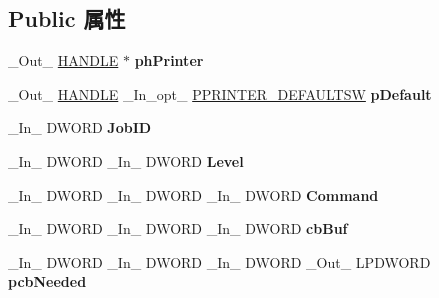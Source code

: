 \subsection*{Public 属性}
\begin{DoxyCompactItemize}
\item 
\mbox{\label{struct___p_r_i_n_t_p_r_o_v_i_d_o_r_ac4fcfcd20a19b080fd0873e2b8cba8e6}} 
\+\_\+\+Out\+\_\+ \hyperlink{interfacevoid}{H\+A\+N\+D\+LE} $\ast$ {\bfseries ph\+Printer}
\item 
\mbox{\label{struct___p_r_i_n_t_p_r_o_v_i_d_o_r_ab5c35acd6aad201cb9554fdc0b8255ff}} 
\+\_\+\+Out\+\_\+ \hyperlink{interfacevoid}{H\+A\+N\+D\+LE} \+\_\+\+In\+\_\+opt\+\_\+ \hyperlink{struct___p_r_i_n_t_e_r___d_e_f_a_u_l_t_s_w}{P\+P\+R\+I\+N\+T\+E\+R\+\_\+\+D\+E\+F\+A\+U\+L\+T\+SW} {\bfseries p\+Default}
\item 
\mbox{\label{struct___p_r_i_n_t_p_r_o_v_i_d_o_r_a7c3f4af3a2bed45e8647019e83af1e6c}} 
\+\_\+\+In\+\_\+ D\+W\+O\+RD {\bfseries Job\+ID}
\item 
\mbox{\label{struct___p_r_i_n_t_p_r_o_v_i_d_o_r_a8029083bfd896099954d260a08953b11}} 
\+\_\+\+In\+\_\+ D\+W\+O\+RD \+\_\+\+In\+\_\+ D\+W\+O\+RD {\bfseries Level}
\item 
\mbox{\label{struct___p_r_i_n_t_p_r_o_v_i_d_o_r_a5b29605f4ab2c9a33db41cc5e04fbc1b}} 
\+\_\+\+In\+\_\+ D\+W\+O\+RD \+\_\+\+In\+\_\+ D\+W\+O\+RD \+\_\+\+In\+\_\+ D\+W\+O\+RD {\bfseries Command}
\item 
\mbox{\label{struct___p_r_i_n_t_p_r_o_v_i_d_o_r_a26695f8406e3fe6648c550ce036b3d7c}} 
\+\_\+\+In\+\_\+ D\+W\+O\+RD \+\_\+\+In\+\_\+ D\+W\+O\+RD \+\_\+\+In\+\_\+ D\+W\+O\+RD {\bfseries cb\+Buf}
\item 
\mbox{\label{struct___p_r_i_n_t_p_r_o_v_i_d_o_r_aedfde952f34cd96168aa394ea81e195e}} 
\+\_\+\+In\+\_\+ D\+W\+O\+RD \+\_\+\+In\+\_\+ D\+W\+O\+RD \+\_\+\+In\+\_\+ D\+W\+O\+RD \+\_\+\+Out\+\_\+ L\+P\+D\+W\+O\+RD {\bfseries pcb\+Needed}
\item 
\mbox{\label{struct___p_r_i_n_t_p_r_o_v_i_d_o_r_ad75701dbd52aa961c85dac87379bd71f}} 

\end{DoxyCompactItemize}
